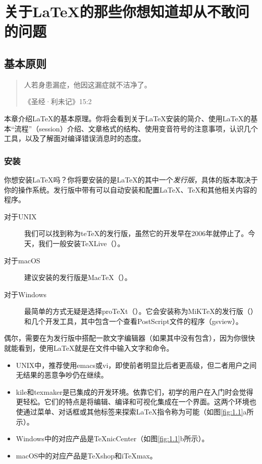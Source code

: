 \part{关于\LaTeX 的那些你想知道却从不敢问的问题}

\chapter{基本原则}
\begin{quote}
    人若身患漏症，他因这漏症就不洁净了。
    
    \hfill 《圣经·利未记》15:2
\end{quote}

本章介绍\LaTeX 的基本原理。你将会看到关于\LaTeX 安装的简介、使用\LaTeX 的基本“流程”（session）介绍、文章格式的结构、使用变音符号的注意事项，认识几个工具，以及了解面对编译错误消息时的态度。

\section{安装}

你想安装\LaTeX 吗？你将要安装的是\LaTeX 的其中一个\textit{发行版}，具体的版本取决于你的操作系统。发行版中带有可以自动安装和配置\LaTeX 、\TeX 和其他相关内容的程序。

\begin{description}
\item[对于UNIX]我们可以找到称为te\TeX 的发行版，虽然它的开发早在2006年就停止了。今天，我们一般安装\TeX Live（）。

\item[对于macOS]建议安装的发行版是Mac\TeX（）。

\item[对于Windows]最简单的方式无疑是选择pro\TeX t（）。它会安装称为MiK\TeX 的发行版（）和几个开发工具，其中包含一个查看PostScript文件的程序（\textsf{gsview}）。

\end{description}

偶尔，需要在为发行版中搭配一款文字编辑器（如果其中没有包含），因为你很快就能看到，使用\LaTeX 就是在文件中输入文字和命令。

\begin{itemize}
    \item UNIX中，推荐使用\textsf{emacs}或\textsf{vi}，即使前者明显比后者更高级，但二者用户之间无结果的恶意争吵仍在继续。
    \item \textsf{kile}和\textsf{texmaker}是已集成的开发环境。依靠它们，初学的用户在入门时会觉得更轻松。它们的特点是将编辑、编译和可视化集成在一个界面。这两个环境也使通过菜单、对话框或其他标签来探索\LaTeX 指令称为可能（如图\ref{fig:1.1}a所示）。
    \item Windows中的对应产品是\textsf{\TeX nicCenter}（如图\ref{fig:1.1}b所示）。
    \item macOS中的对应产品是\textsf{\TeX shop}和\textsf{i\TeX max}。
\end{itemize}

